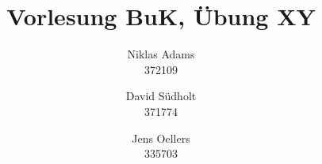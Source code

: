 \documentclass{exercisesheet}
\title{Vorlesung BuK, Übung XY}
\author{
    Niklas Adams  \\ 372109
    \and
    David S\"udholt   \\ 371774
    \and
    Jens Oellers   \\ 335703
}
\begin{document}
\maketitle
\pointtable
\end{document}
